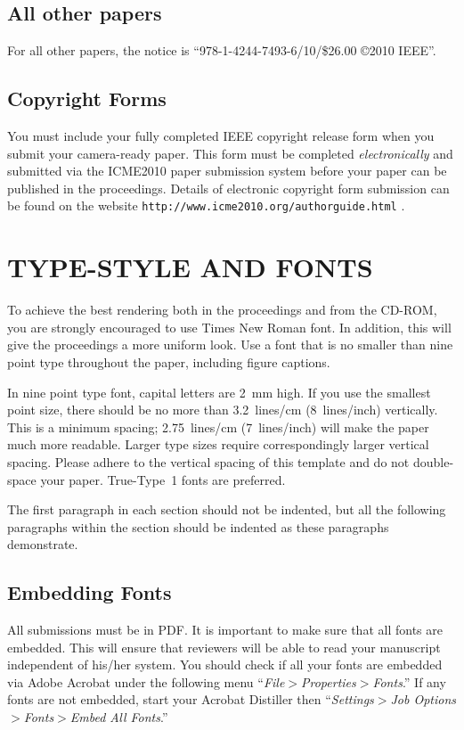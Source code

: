 \documentclass{article}
\begin{document}
\subsection{All other papers}
For all other papers, the notice is ``978-1-4244-7493-6/10/\$26.00
\copyright2010 IEEE''.

\subsection{Copyright Forms} \label{sec:copyright}

You must include your fully completed IEEE copyright release form
when you submit your camera-ready paper. This form must be completed
\emph{electronically} and submitted via the ICME2010 paper
submission system before your paper can be published in the
proceedings. Details of electronic copyright form submission can be
found on the website \verb"http://www.icme2010.org/authorguide.html"
.


\section{TYPE-STYLE AND FONTS}
\label{sec:typestyle}

To achieve the best rendering both in the proceedings and from the
CD-ROM, you are strongly encouraged to use Times New Roman font.  In
addition, this will give the proceedings a more uniform look.  Use a
font that is no smaller than nine point type throughout the paper,
including figure captions.

In nine point type font, capital letters are 2~mm high.  If you use
the smallest point size, there should be no more than 3.2~lines/cm
(8~lines/inch) vertically.  This is a minimum spacing; 2.75~lines/cm
(7~lines/inch) will make the paper much more readable.  Larger type
sizes require correspondingly larger vertical spacing.  Please
adhere to the vertical spacing of this template and do not
double-space your paper. True-Type~1 fonts are preferred.

The first paragraph in each section should not be indented, but all the
following paragraphs within the section should be indented as these paragraphs
demonstrate.

\subsection{Embedding Fonts}
\label{sec:embedFonts}

All submissions must be in PDF. It is important to make sure that
all fonts are embedded. This will ensure that reviewers will be able
to read your manuscript independent of his/her system. You should
check if all your fonts are embedded via Adobe Acrobat under the
following menu ``\emph{File$>$Properties$>$Fonts}.'' If any fonts
are not embedded, start your Acrobat Distiller then
``\emph{Settings$>$Job Options$>$Fonts$>$Embed All Fonts}.''
\end{document}
